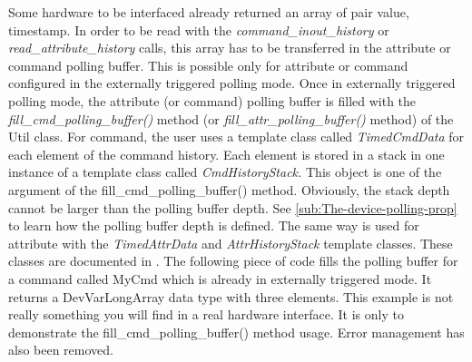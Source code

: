 Some hardware to be interfaced already returned an array of pair value,
timestamp. In order to be read with the \emph{command\_inout\_history}
or \emph{read\_attribute\_history} calls, this array has to be transferred
in the attribute or command polling buffer. This is possible only
for attribute or command configured in the externally triggered polling
mode. Once in externally triggered polling mode, the attribute (or
command) polling buffer is filled with the \emph{fill\_cmd\_polling\_buffer()}
method (or \emph{fill\_attr\_polling\_buffer()}
method) of the Util class. For command, the user uses a template class
called \emph{TimedCmdData} for each element of
the command history. Each element is stored in a stack in one instance
of a template class called \emph{CmdHistoryStack.}
This object is one of the argument of the fill\_cmd\_polling\_buffer()
method. Obviously, the stack depth cannot be larger than the polling
buffer depth. See \ref{sub:The-device-polling-prop} to learn how
the polling buffer depth is defined. The same way is used for attribute
with the \emph{TimedAttrData} and \emph{AttrHistoryStack}
template classes. These classes are documented in \cite{TANGO_ref_man}.
The following piece of code fills the polling buffer for a command
called MyCmd which is already in externally triggered mode. It returns
a DevVarLongArray data type with three elements. This example is not
really something you will find in a real hardware interface. It is
only to demonstrate the fill\_cmd\_polling\_buffer() method usage.
Error management has also been removed.

